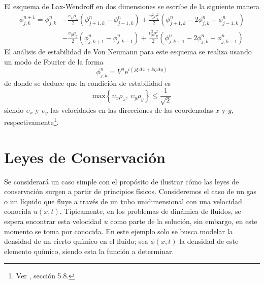 \documentclass[11pt,twoside,openright,spanish]{report}
\numberwithin{equation}{chapter}
\numberwithin{figure}{chapter}
\numberwithin{table}{chapter}
\begin{document}
El esquema de Lax-Wendroff en dos dimensiones se escribe de la siguiente manera
\begin{eqnarray}
\nonumber
\phi^{n+1}_{j,k}=\phi^n_{j,k}&-\frac{\upsilon_x \rho_x}{2}\left(\phi_{j+1,k}^n-\phi_{j-1,k}^n\right)+\frac{\upsilon_x^2\rho_x^2}{2}\left(\phi^n_{j+1,k}-2\phi^n_{j,k}+\phi^n_{j-1,k}\right)\\
&-\frac{\upsilon_y \rho_y}{2}\left(\phi_{j,k+1}^n-\phi_{j,k-1}^n\right)+\frac{\upsilon_y^2\rho_y^2}{2}\left(\phi^n_{j,k+1}-2\phi^n_{j,k}+\phi^n_{j,k-1}\right)
\end{eqnarray}
El análisis de estabilidad de Von Neumann para este esquema se realiza usando un modo de Fourier de la forma
\begin{equation}
\phi^n_{j,k}=V^n\text{e}^{i\left(j\xi\Delta x+k\eta\Delta y\right)}
\end{equation}
de donde se deduce que la condición de estabilidad es
\begin{equation}
\text{max}\left\{\upsilon_x \rho_x,\ \upsilon_y\rho_y\right\}\leq \frac{1}{\sqrt{2}}
\label{cfl}
\end{equation}
siendo $\upsilon_x$ y $\upsilon_y$ las velocidades en las direcciones de las coordenadas $x$ y $y$, respectivamente\footnote{Ver \citet{Thomas1998}, sección 5.8.}.

\section{Leyes de Conservación}\label{sec:leyesdeconservacion}
\noindent
Se considerará un caso simple con el propósito de ilustrar cómo las leyes de conservación surgen a partir de principios físicos. Consideremos el caso de un gas o un líquido que fluye a través de un tubo unidimensional con una velocidad conocida $u(x,t)$. Típicamente, en los problemas de dinámica de fluidos, se espera encontrar esta velocidad $u$ como parte de la solución, sin embargo, en este momento se toma por conocida. En este ejemplo solo se busca modelar la densidad de un cierto químico en el fluido; sea $\phi(x,t)$ la densidad de este elemento químico, siendo esta la función a determinar.
\end{document}
